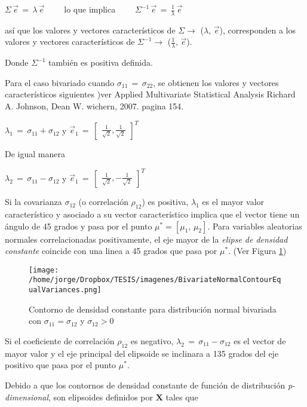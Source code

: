 \documentclass[spanish]{report}
\begin{document}
$\Sigma\,\vec{e}\,=\,\lambda\,\vec{e}\qquad$ lo que implica $\qquad\Sigma^{-1}\,\vec{e}\,=\,\frac{1}{\lambda}\,\vec{e}$

así que los valores y vectores característicos de $\Sigma\rightarrow$ ($\lambda,\,\vec{e}$), corresponden a los valores y vectores característicos de $\Sigma^{-1}\rightarrow$ ($\frac{1}{\lambda},\,\vec{e}$). 

Donde $\Sigma^{-1}$ también es positiva definida.

Para el caso bivariado cuando $\sigma_{11}\,=\,\sigma_{22}$, se obtienen los valores y vectores característicos siguientes )ver Applied Multivariate Statistical Analysis Richard A. Johnson, Dean W. wichern, 2007. pagina 154.

$\lambda_1\,=\,\sigma_{11}+\sigma_{12}$ y $\vec{e}_1\,=\,\begin{bmatrix}
\frac{1}{\sqrt{2}},
\frac{1}{\sqrt{2}}
\end{bmatrix}^T$

De igual manera 

$\lambda_2\,=\,\sigma_{11}-\sigma_{12}$ y $\vec{e}_1\,=\,\begin{bmatrix}
\frac{1}{\sqrt{2}},-\frac{1}{\sqrt{2}}
\end{bmatrix}^T$

Si la covarianza $\sigma_{12}$ (o correlación $\rho_{12}$) es positiva, $\lambda_1$ es el mayor valor característico y asociado a su vector característico implica que el vector tiene un ángulo de 45 grados y pasa por el punto $\mu^* = [\mu_1,\,\mu_2]$. Para variables aleatorias normales correlacionadas positivamente, el eje mayor de la \emph{elipse de densidad constante} coincide con una linea a 45 grados que pasa por $\mu^*$. (Ver Figura \ref{c2f4})

\begin{figure}[H]
\centering
\texttt{[image: /home/jorge/Dropbox/TESIS/imagenes/BivariateNormalContourEqualVariances.png]}
\caption{Contorno de densidad constante para distribución normal bivariada con $\sigma_{11}=\sigma_{12}$ y $\sigma_{12} > 0$}
\label{c2f4}
\end{figure}

Si el coeficiente de correlación $\rho_{12}$ es negativo, $\lambda_2\,=\,\sigma_{11}-\sigma_{12}$ es el vector de mayor valor y el eje principal del elipsoide se inclinara a 135 grados del eje positivo que pasa por el punto $\mu^*$.

Debido a que los contornos de densidad constante de función de distribución \emph{p-dimensional}, son elipsoides definidos por $\textbf{X}$ tales que  
\end{document}
